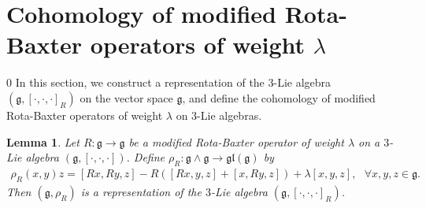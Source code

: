 \documentclass[12pt]{amsart}
\newtheorem{lem}[theorem]{Lemma}
\theoremstyle{definition}
\begin{document}
\bigskip

\section{Cohomology of modified Rota-Baxter operators of weight $\lambda$}\label{Cohomology of modified Rota-Baxter operators of weight}
\def\theequation{\arabic{section}.\arabic{equation}}
\setcounter{equation} {0}
In this section, we construct a representation of the $3$-Lie algebra $(\mathfrak{g}, [\cdot, \cdot, \cdot]_R)$ on the vector space
$\mathfrak{g}$, and define the cohomology of modified Rota-Baxter operators of weight $\lambda$ on $3$-Lie algebras.

\begin{lem}
Let $R: \mathfrak{g}\rightarrow \mathfrak{g} $ be a modified Rota-Baxter operator of weight $\lambda$ on a $3$-Lie algebra $(\mathfrak{g}, [\cdot, \cdot, \cdot])$. Define $\rho_R: \mathfrak{g}\wedge \mathfrak{g}\rightarrow \mathfrak{gl}(\mathfrak{g})$ by
\begin{align}
\rho_R(x, y)z=[Rx,Ry, z]-R([Rx, y, z]+[x, Ry, z])+\lambda[x, y, z], \ \ \ \forall x, y, z \in \mathfrak{g}. \label{5.1}
\end{align}
 Then $(\mathfrak{g},  \rho_R)$ is a representation of the $3$-Lie algebra $(\mathfrak{g}, [\cdot, \cdot, \cdot]_R)$.
\end{lem}
\end{document}
